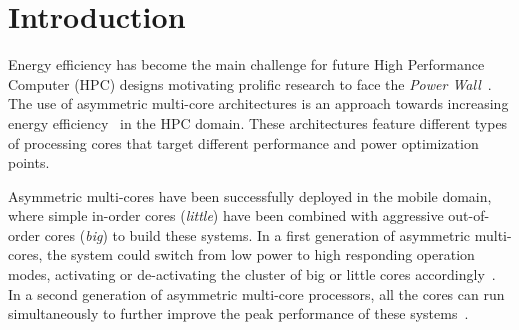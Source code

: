 
\chapter{Introduction}  %

\ifpdf
    \graphicspath{{Chapter1/Figs/Raster/}{Chapter1/Figs/PDF/}{Chapter1/Figs/}}
\else
    \graphicspath{{Chapter1/Figs/Vector/}{Chapter1/Figs/}}
\fi

 
Energy efficiency has become the main challenge for future High Performance Computer (HPC) designs motivating prolific research to face the \textit{Power Wall}~\cite{Kogge_Exascale_TR08}.
The use of asymmetric multi-core architectures is an approach towards increasing energy efficiency~\cite{Fedorova2009,Greenhalgh2011,Kumar:ISCA2004,Balakrishnan:ISCA2005} in the HPC domain.
These architectures feature different types of processing cores that target different performance and power optimization points.




Asymmetric multi-cores have been successfully deployed in the mobile domain, where simple in-order cores (\emph{little}) have been combined with aggressive out-of-order cores (\emph{big}) to build these systems. In a first generation of asymmetric multi-cores, the system could switch from low power to high responding operation modes, activating or de-activating the cluster of big or little cores accordingly~\cite{ARM}. In a second generation of asymmetric multi-core processors, all the cores can run simultaneously to further improve the peak performance of these systems~\cite{samsung}.

